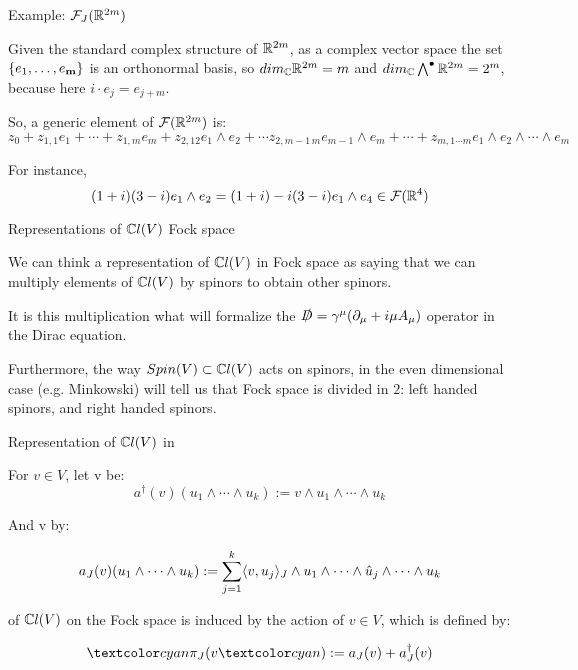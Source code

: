 \begin{frame}{Example: $\mathcal F_J(\mathbb R^{2m})$} %
    
    Given the standard complex structure of $\mathbb R^{2m}$, as a complex vector space the set $\{e_1, \dots, e_{\textbf{m}}\}$ is an orthonormal basis, so $dim_\mathbb C\mathbb R^{2m} = m$ and $dim_\mathbb C \bigwedge^\bullet \mathbb R^{2m} = 2^m$, because here $i\cdot e_j = e_{j+m}$.
    
    So, a generic element of $\mathcal F(\mathbb R^{2m})$ is: \quad $z_0 + z_{1,1}e_1 + \cdots + z_{1,m} e_m + z_{2, 12} e_1\wedge e_2 + \cdots z_{2, m-1\, m} e_{m-1} \wedge e_{m} + \cdots + z_{m, 1\cdots m} e_1 \wedge e_2 \wedge \cdots \wedge e_m $
    
    For instance, \[(1+i) (3-i)e_1 \wedge e_2 = (1+i) - i(3-i) e_1 \wedge e_4 \in \mathcal F(\mathbb R^4)\]
    
\end{frame}

\begin{frame}{Representations of $\mathbb C l(V)$ \Iff Fock space}

    We can think a representation of $\mathbb C l(V)$ in Fock space as saying that we can multiply elements of $\mathbb C l(V)$ by spinors to obtain other spinors. 
    
    It is this multiplication what will formalize the $\slashed D = \gamma^\mu ( \partial_\mu + i \mu A_\mu)$ operator in the Dirac equation.
    
    Furthermore, the way $Spin(V) \subset \mathbb C l(V)$ acts on spinors, in the even dimensional case (e.g. Minkowski) will tell us that Fock space is divided in $2$: left handed spinors, and right handed spinors.
    
\end{frame}

\begin{frame}{Representation of $\mathbb C l(V)$ in \fjv} %
    
    For $v \in V$, let v be:
    \[ a^\dagger(v) (u_1 \wedge \cdots \wedge u_k) := v \wedge u_1 \wedge \cdots \wedge u_k \]
    
    And v by:
    
    \[ a_J(v) (u_1 \wedge \cdots \wedge u_k) := \sum_{j = 1}^k \langle v, u_j \rangle_J \wedge u_1 \wedge \cdots \wedge \hat u_j \wedge \cdots  \wedge u_k \]
    
     of $\mathbb C l(V)$ on the Fock space is induced by the action of $v \in V$, which is defined by:
    
    \[ \defn{\pi_J(}v\defn{)} := a_J(v) + a_J^\dagger(v) \]

\end{frame}

